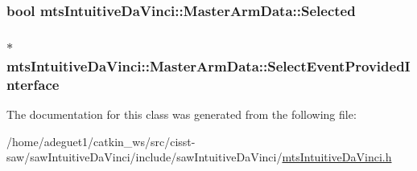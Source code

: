 \hypertarget{classmts_intuitive_da_vinci_1_1_master_arm_data_a7e0c4a473c2ef763ab47513edb9dd8d8}{
\subsubsection[{Selected}]{\setlength{\rightskip}{0pt plus 5cm}bool mts\-Intuitive\-Da\-Vinci\-::\-Master\-Arm\-Data\-::\-Selected}}\label{classmts_intuitive_da_vinci_1_1_master_arm_data_a7e0c4a473c2ef763ab47513edb9dd8d8}
\hypertarget{classmts_intuitive_da_vinci_1_1_master_arm_data_ae0abfe69ca750c526f1e4b86bba2ac93}{
\subsubsection[{Select\-Event\-Provided\-Interface}]{$\ast$ mts\-Intuitive\-Da\-Vinci\-::\-Master\-Arm\-Data\-::\-Select\-Event\-Provided\-Interface}}\label{classmts_intuitive_da_vinci_1_1_master_arm_data_ae0abfe69ca750c526f1e4b86bba2ac93}


The documentation for this class was generated from the following file\-:\begin{DoxyCompactItemize}
\item 
/home/adeguet1/catkin\-\_\-ws/src/cisst-\/saw/saw\-Intuitive\-Da\-Vinci/include/saw\-Intuitive\-Da\-Vinci/\hyperlink{mts_intuitive_da_vinci_8h}{mts\-Intuitive\-Da\-Vinci.\-h}\end{DoxyCompactItemize}
